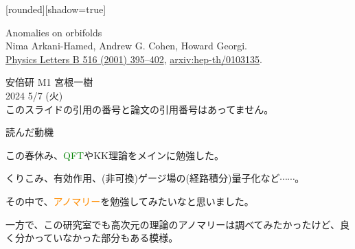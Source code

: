 \documentclass[
  unicode,a4paper,10pt,
  xcolor = {dvipsnames,svgnames},
  hyperref ={colorlinks=true,citecolor=Navy,linkcolor=NavyBlue,urlcolor=purple},
  ja=standard,lualatex
]{beamer}
\begin{document}
\nocite{Arkani-Hamed:2001uol}

\begin{frame}

  [rounded][shadow=true]
  \begin{block}{}
    \vspace*{5pt}

    \centering\Large
    Anomalies on orbifolds
    \\
    \normalsize
    Nima Arkani-Hamed, Andrew G. Cohen, Howard Georgi.
    \\
    \small
    \href{https://doi.org/10.1016/S0370-2693(01)00946-7}{Physics Letters B 516 (2001) 395–402},
    \href{https://doi.org/10.48550/arXiv.hep-th/0103135}{arxiv:hep-th/0103135}.

    \vspace*{5pt}
  \end{block}

  \begin{center}
    安倍研 M1 宮根一樹\\
    2024 5/7 (火)\\

    このスライドの引用の番号と論文の引用番号はあってません。
  \end{center}

\end{frame}


\begin{frame}{読んだ動機}

  この春休み、\textcolor{Green}{QFT}やKK理論をメインに勉強した。

  \vspace*{5pt}
  
  くりこみ、有効作用、(非可換)ゲージ場の(経路積分)量子化など$\cdots\cdots$。

  \vspace*{5pt}
  
  その中で、\textcolor{DarkOrange}{アノマリー}を勉強してみたいなと思いました。

  \vspace*{10pt}

  一方で、この研究室でも高次元の理論のアノマリーは調べてみたかったけど、良く分かっていなかった部分もある模様。

\end{frame}
\end{document}
